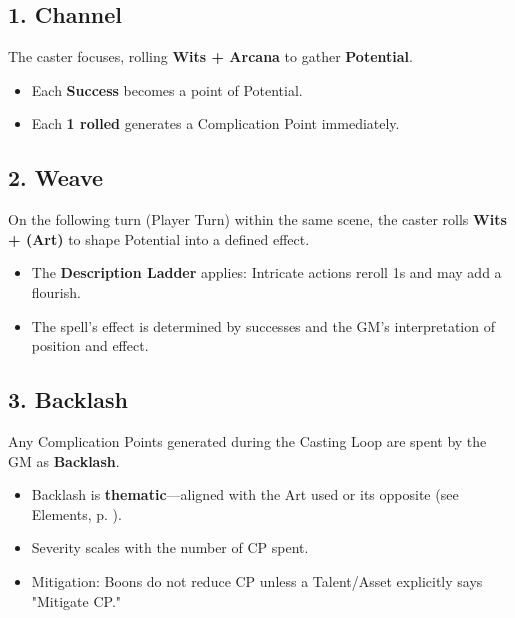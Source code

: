\subsection*{1. Channel}

The caster focuses, rolling \textbf{Wits + Arcana}  to gather \textbf{Potential}.

\begin{itemize}
  \item Each \textbf{Success} becomes a point of Potential.
  \item Each \textbf{1 rolled} generates a Complication Point immediately.
\end{itemize}

\subsection*{2. Weave}

On the following turn (Player Turn) within the same scene, the caster rolls \textbf{Wits + (Art)} to shape Potential into a defined effect.

\begin{itemize}
  \item The \textbf{Description Ladder}  applies: Intricate actions reroll 1s and may add a flourish.
  \item The spell's effect is determined by successes and the GM's interpretation of position and effect.
\end{itemize}

\subsection*{3. Backlash}

Any Complication Points generated during the Casting Loop are spent by the GM as \textbf{Backlash}.

\begin{itemize}
  \item Backlash is \textbf{thematic}—aligned with the Art used or its opposite (see Elements, p. \pageref{ch:elements}).
  \item Severity scales with the number of CP spent.
  \item Mitigation: Boons  do not reduce CP unless a Talent/Asset explicitly says "Mitigate CP."
\end{itemize}

